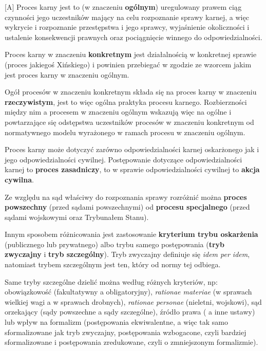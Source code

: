 [{\kolor A}]
Proces karny jest to (w znaczeniu \textbf{ogólnym}) uregulowany prawem ciąg czynności jego uczestników mający na celu rozpoznanie sprawy karnej, a więc wykrycie i rozpoznanie przestępstwa i jego sprawcy, wyjaśnienie okoliczności i ustalenie konsekwencji prawnych oraz pociągnięcie winnego do odpowiedzialności.\medskip

Proces karny w znaczeniu \textbf{konkretnym} jest działalnością w konkretnej sprawie (proces jakiegoś Xińskiego) i powinien przebiegać w zgodzie ze wzorcem jakim jest proces karny w znaczeniu ogólnym.\medskip

Ogół procesów w znaczeniu konkretnym składa się na proces karny w znaczeniu \textbf{rzeczywistym}, jest to więc ogólna praktyka procesu karnego. Rozbierzności między nim a procesem w znaczeniu ogólnym wskazują więc na ogólne i powtarzające się odstępstwa uczestników procesów w znaczeniu konkretnym od normatywnego modelu wyrażonego w ramach procesu w znaczeniu ogólnym.\medskip

Proces karny może dotyczyć zarówno odpowiedzialności karnej oskarżonego jak i jego odpowiedzialności cywilnej. Postępowanie dotyczące odpowiedzialności karnej to \textbf{proces zasadniczy}, to w sprawie odpowiedzialności cywilnej to \textbf{akcja cywilna}.\medskip

Ze względu na sąd właściwy do rozpoznania sprawy rozróżnić można \textbf{proces powszechny} (przed sądami powszechnymi) od \textbf{procesu specjalnego} (przed sądami wojskowymi oraz Trybunałem Stanu).\medskip

Innym sposobem różnicowania jest zastosowanie \textbf{kryterium trybu oskarżenia} (publicznego lub prywatnego) albo trybu samego postępowania (\textbf{tryb zwyczajny} i \textbf{tryb szczególny}). Tryb zwyczajny definiuje się \textit{idem per idem}, natomiast trybem szczególnym jest ten, który od normy tej odbiega.\medskip

Same tryby szczególne dzielić można według różnych kryteriów, np: obowiązkowość (fakultatywny a obligatoryjny), \textit{rationae materiae} (w sprawach wielkiej wagi a w sprawach drobnych), \textit{rationae personae} (nieletni, wojskowi), sąd orzekający (sądy powszechne a sądy szczególne), źródło prawa ( a inne ustawy) lub wpływ na formalizm (postępowania ekwiwalentne, a więc tak samo sformalizowane jak tryb zwyczajny, postępowania wzbogacone, czyli bardziej sformalizowane i postępowania zredukowane, czyli o zmniejszonym formalizmie).


